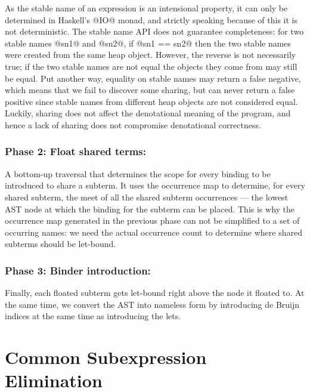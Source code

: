 As the stable name of an expression is an intensional property, it can only be
determined in Haskell's @IO@ monad, and strictly speaking because of this
it is not deterministic. The stable name API does not guarantee completeness:
for two stable names @sn1@ and @sn2@, if @sn1 == sn2@ then the
two stable names were created from the same heap object. However, the reverse is
not necessarily true; if the two stable names are not equal the objects they
come from may still be equal. Put another way, equality on stable names may
return a false negative, which means that we fail to discover some sharing, but
can never return a false positive since stable names from different heap objects
are not considered equal. Luckily, sharing does not affect the denotational
meaning of the program, and hence a lack of sharing does not compromise
denotational correctness.


\subsubsection*{Phase 2: Float shared terms:}

A bottom-up traversal that determines the scope for every binding to be
introduced to share a subterm. It uses the occurrence map to determine, for
every shared subterm, the meet of all the shared subterm occurrences --- the
lowest AST node at which the binding for the subterm can be placed. This is why
the occurrence map generated in the previous phase can not be simplified to
a set of occurring names: we need the actual occurrence count to determine where
shared subterms should be let-bound.


\subsubsection*{Phase 3: Binder introduction:}

Finally, each floated subterm gets let-bound right above the node it floated to.
At the same time, we convert the AST into nameless  form by
introducing de Bruijn indices at the same time as introducing the lets.


\section{Common Subexpression Elimination}
\label{sec:cse}

